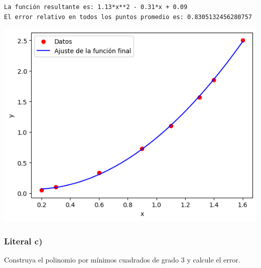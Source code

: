 \documentclass[
  letterpaper,
  DIV=11,
  numbers=noendperiod]{scrartcl}
\begin{document}
\begin{verbatim}
La función resultante es: 1.13*x**2 - 0.31*x + 0.09
El error relativo en todos los puntos promedio es: 0.8305132456280757
\end{verbatim}

\includegraphics{Tarea8_MN_files/figure-pdf/cell-11-output-2.png}

\subsubsection{Literal c)}\label{literal-c-1}

Construya el polinomio por mínimos cuadrados de grado 3 y calcule el
error.
\end{document}
